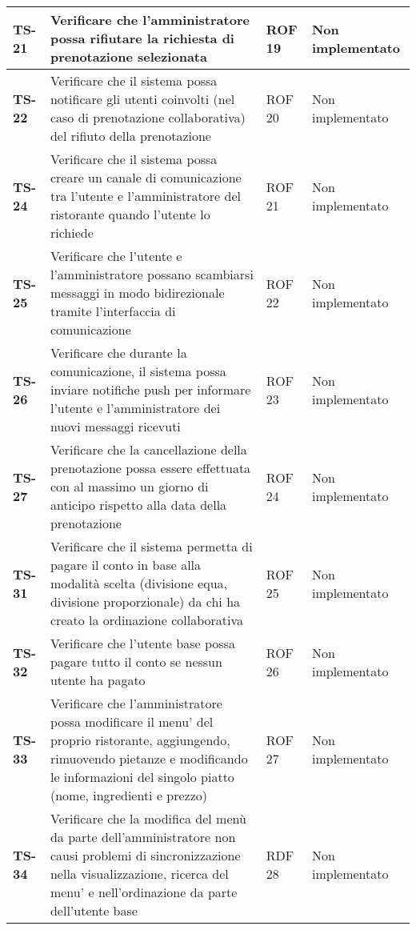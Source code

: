 \begin{longtable}{|>{\centering\arraybackslash}p{1.5cm}|p{9.8cm}|p{2cm}|p{3.5cm}|}
    \hline
    \rowcolor{gray!10}
    \textbf{TS-21} & Verificare che l'amministratore possa rifiutare la richiesta di prenotazione selezionata & ROF 19 & Non implementato \\ 
    \hline
    \rowcolor{gray!10}
    \textbf{TS-22} & Verificare che il sistema possa notificare gli utenti coinvolti (nel caso di prenotazione collaborativa) del rifiuto della prenotazione & ROF 20 & Non implementato \\ 
    \hline
    \rowcolor{gray!10}
    \textbf{TS-24} & Verificare che il sistema possa creare un canale di comunicazione tra l'utente e l'amministratore del ristorante quando l'utente lo richiede & ROF 21 & Non implementato \\
    \hline
    \rowcolor{gray!10}
    \textbf{TS-25} & Verificare che l'utente e l'amministratore possano scambiarsi messaggi in modo bidirezionale tramite l'interfaccia di comunicazione & ROF 22 & Non implementato \\ 
    \hline 
    \rowcolor{gray!10}
    \textbf{TS-26} & Verificare che durante la comunicazione, il sistema possa inviare notifiche push per informare l'utente e l'amministratore dei nuovi messaggi ricevuti & ROF 23 & Non implementato \\ 
    \hline
    \rowcolor{gray!10}
    \textbf{TS-27} & Verificare che la cancellazione della prenotazione possa essere effettuata con al massimo un giorno di anticipo rispetto alla data della prenotazione & ROF 24 & Non implementato \\
    \hline
    \rowcolor{gray!10}
    \textbf{TS-31} & Verificare che il sistema permetta di pagare il conto in base alla modalità scelta (divisione equa, divisione proporzionale) da chi ha creato la ordinazione collaborativa & ROF 25 & Non implementato \\
    \hline
    \rowcolor{gray!10}
    \textbf{TS-32} & Verificare che l'utente base possa pagare tutto il conto se nessun utente ha pagato & ROF 26 & Non implementato \\
    \hline
    \rowcolor{gray!10}
    \textbf{TS-33} & Verificare che l'amministratore possa modificare il menu' del proprio ristorante, aggiungendo, rimuovendo pietanze e modificando le informazioni del singolo piatto (nome, ingredienti e prezzo) & ROF 27 & Non implementato \\
    \hline
    \rowcolor{gray!10}
    \textbf{TS-34} & Verificare che la modifica del menù da parte dell'amministratore non causi problemi di sincronizzazione nella visualizzazione, ricerca del menu' e nell'ordinazione da parte dell'utente base & RDF 28 & Non implementato \\ 

\end{longtable}
